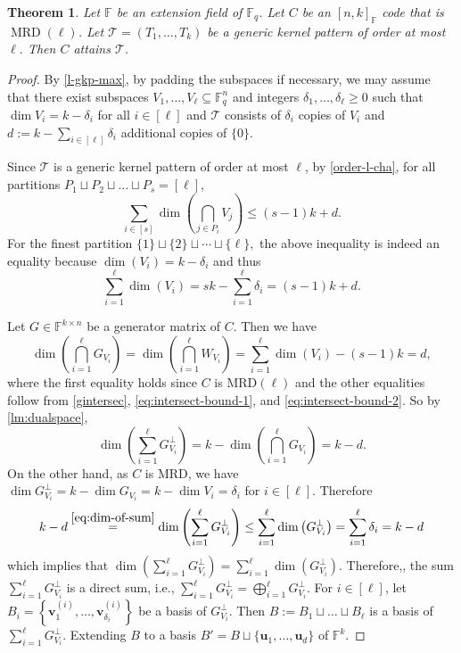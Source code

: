 \documentclass[11pt]{article}
\theoremstyle{plain}
\newtheorem{thm}{Theorem}[section]
\theoremstyle{definition}
\theoremstyle{remark}
\newcommand{\F}{\mathbb{F}}
\newcommand{\bv}{\bm{v}}
\newcommand{\bu}{\bm{u}}
\begin{document}
\begin{thm}\label{mrd-gkp}
Let $\F$ be an extension field of $\F_q$. Let $C$ be an $[n, k]_{\F}$ code that is $\operatorname{MRD}(\ell)$.
Let $\mathcal{T}=(T_1,\dots,T_k)$ be a  generic kernel pattern of order at most $\ell$. Then $C$ attains $\mathcal{T}$. 
\end{thm}
\begin{proof}
By \cref{l-gkp-max}, by padding the subspaces if necessary, we may assume that there exist subspaces $V_1,\dots,V_\ell\subseteq\F_q^n$ and integers $\delta_1,\dots,\delta_\ell\geq 0$ 
such that $\dim V_i=k-\delta_i$ for all $i\in[\ell]$ and $\mathcal{T}$ consists of $\delta_i$ copies of $V_i$ and $d:=k-\sum_{i\in[\ell]}\delta_i$ additional copies of $\{0\}$.

Since $\mathcal{T}$ is a generic kernel pattern of order at most $\ell$, by \cref{order-l-cha}, for all partitions $P_1\sqcup P_2\sqcup\dots\sqcup P_s=[\ell]$,
\begin{equation}\label{eq:intersect-bound-1}
\sum_{i\in [s]}\dim\left(\bigcap_{j\in P_i}V_{j}\right)\leq (s-1)k+d.
\end{equation}
For the finest partition $\{1\}\sqcup\{2\}\sqcup\cdots\sqcup\{\ell\},$ the above inequality is indeed an equality because $\dim(V_i)=k-\delta_i$ and thus 
\begin{equation}\label{eq:intersect-bound-2}
\sum_{i=1}^{\ell} \dim(V_i)=sk-\sum_{i=1}^{\ell}\delta_i=(s-1)k+d.
\end{equation}

Let $G\in\F^{k\times n}$ be a generator matrix of $C$.
Then we have
\[
\dim\left(\bigcap_{i=1}^\ell G_{V_{i}}\right)=\dim\left(\bigcap_{i=1}^\ell W_{V_{i}}\right)=\sum_{i=1}^{\ell} \dim(V_i)-(s-1)k=d,
\]
where the first equality holds since $C$ is $\mathrm{MRD}(\ell)$ and the other equalities follow from \cref{gintersec}, \eqref{eq:intersect-bound-1}, and \eqref{eq:intersect-bound-2}.
So by \cref{lm:dualspace},
\begin{equation}\label{eq:dim-of-sum}
\dim \left(\sum_{i=1}^\ell G_{V_i}^{\perp}\right)=k-\dim\left(\bigcap_{i=1}^\ell G_{V_{i}}\right)=k-d.
\end{equation}
On the other hand, as $C$ is MRD, we have $\dim G_{V_i}^{\perp}=k-\dim G_{V_i}=k-\dim V_i=\delta_i$ for $i\in [\ell]$. Therefore
\[
k-d\stackrel{\eqref{eq:dim-of-sum}}{=}\dim \left(\sum_{i=1}^\ell G_{V_i}^{\perp}\right)\leq \sum_{i=1}^\ell \dim\left(G_{V_i}^\perp\right)= \sum_{i=1}^{\ell}\delta_i=k-d
\]
which implies that $\dim \left(\sum_{i=1}^\ell G_{V_i}^{\perp}\right)=\sum_{i=1}^\ell \dim\left(G_{V_i}^\perp\right)$. Therefore,, the sum $\sum_{i=1}^\ell G_{V_i}^{\perp}$ is a direct sum, i.e., $\sum_{i=1}^\ell G_{V_i}^{\perp}=\bigoplus_{i=1}^\ell G_{V_i}^{\perp}$.
For $i\in [\ell]$, let $B_i=\left\{\bv_1^{(i)},\dots,\bv_{\delta_i}^{(i)}\right\}$ be a basis of $G_{V_i}^{\perp}$.
Then $B:=B_1\sqcup \dots\sqcup B_\ell$ is a basis of $\sum_{i=1}^\ell G_{V_i}^{\perp}$. Extending $B$ to a basis $B'=B\sqcup\{\bu_1,\dots,\bu_d\}$ of $\F^k$.


\end{proof}
\end{document}
